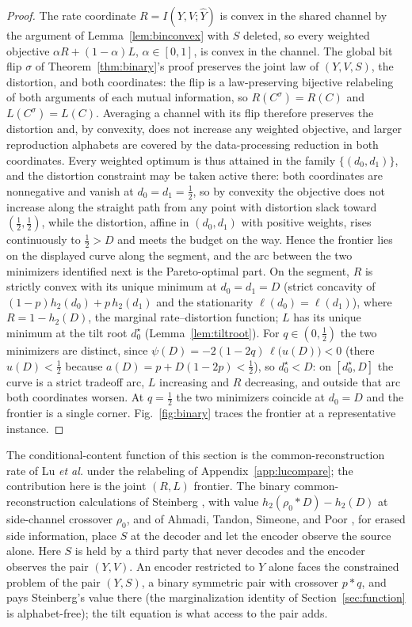 \documentclass[11pt,onecolumn]{IEEEtran}
\newcommand{\hY}{\widehat{Y}}
\begin{document}
\begin{proof}
The rate
coordinate $R=I(Y,V;\hY)$ is convex in the shared channel by the
argument of Lemma~\ref{lem:binconvex} with $S$ deleted, so
every weighted objective $\alpha R+(1-\alpha)L$, $\alpha\in[0,1]$, is
convex in the channel. The global bit flip $\sigma$ of
Theorem~\ref{thm:binary}'s proof preserves the joint law of $(Y,V,S)$,
the distortion, and both coordinates: the flip is a law-preserving
bijective relabeling of both arguments of each mutual information, so
$R(C^\sigma)=R(C)$ and $L(C^\sigma)=L(C)$. Averaging a channel with its
flip therefore preserves the distortion and, by convexity, does not
increase any weighted objective, and larger reproduction alphabets are
covered by the data-processing reduction in both coordinates. Every
weighted optimum is thus attained in the family $\{(d_0,d_1)\}$, and
the distortion constraint may be taken active there: both coordinates
are nonnegative and vanish at $d_0=d_1=\tfrac12$, so by convexity the
objective does not increase along the straight path from any point
with distortion slack toward $(\tfrac12,\tfrac12)$, while the
distortion, affine in $(d_0,d_1)$ with positive weights, rises
continuously to $\tfrac12>D$ and meets the budget on the way. Hence the
frontier lies on the displayed curve along the segment, and the arc
between the two minimizers identified next is the Pareto-optimal part. On the segment, $R$ is strictly convex
with its unique minimum at $d_0=d_1=D$ (strict concavity of
$(1-p)h_2(d_0)+p\,h_2(d_1)$ and the stationarity
$\ell(d_0)=\ell(d_1)$), where $R=1-h_2(D)$, the marginal
rate--distortion function; $L$ has its unique minimum at the tilt root
$d_0^\star$ (Lemma~\ref{lem:tiltroot}). For $q\in(0,\tfrac12)$ the two
minimizers are distinct, since
$\psi(D)=-2(1-2q)\,\ell\bigl(u(D)\bigr)<0$ (there $u(D)<\tfrac12$
because $a(D)=p+D(1-2p)<\tfrac12$), so $d_0^\star<D$: on
$[d_0^\star,D]$ the curve is a strict tradeoff arc, $L$ increasing and
$R$ decreasing, and outside that arc both coordinates worsen. At
$q=\tfrac12$ the two minimizers coincide at $d_0=D$ and the frontier
is a single corner. Fig.~\ref{fig:binary} traces the frontier at a
representative instance.
\end{proof}

The conditional-content function of this section is the
common-reconstruction rate of Lu \emph{et al.} \cite{lu2016lossy} under
the relabeling of Appendix~\ref{app:lucompare}; the contribution here is
the joint $(R,L)$ frontier. The binary common-reconstruction
calculations of Steinberg \cite{steinberg2009}, with value
$h_2(\rho_0*D)-h_2(D)$ at side-channel crossover $\rho_0$, and of
Ahmadi, Tandon, Simeone, and Poor \cite{ahmadi2013}, for erased side
information, place $S$ at the decoder and let the encoder observe the
source alone. Here $S$ is held by a third party that never decodes and
the encoder observes the pair $(Y,V)$. An encoder restricted to $Y$
alone faces the constrained problem of the pair $(Y,S)$, a binary
symmetric pair with crossover $p*q$, and pays Steinberg's value there
(the marginalization identity of Section~\ref{sec:function} is
alphabet-free); the tilt equation is what access to the pair adds.
\end{document}
